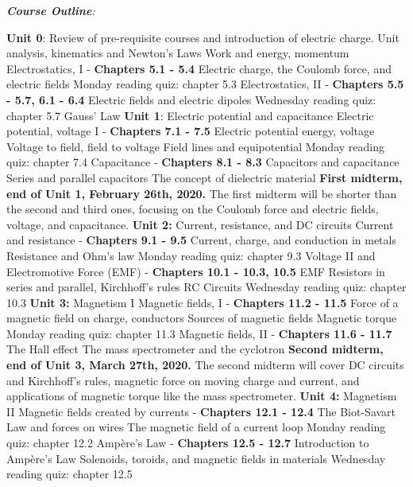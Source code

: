 \documentclass[10pt]{article}
\begin{document}
\clearpage
\small
\textit{\textbf{Course Outline}:}
\begin{outline}[enumerate]
\1 \textbf{Unit 0}: Review of pre-requisite courses and introduction of electric charge.
\2 Unit analysis, kinematics and Newton's Laws
\2 Work and energy, momentum
\2 Electrostatics, I - \textbf{Chapters 5.1 - 5.4}
\3 Electric charge, the Coulomb force, and electric fields
\3 Monday reading quiz: chapter 5.3
\2 Electrostatics, II - \textbf{Chapters 5.5 - 5.7, 6.1 - 6.4}
\3 Electric fields and electric dipoles
\3 Wednesday reading quiz: chapter 5.7
\3 Gauss' Law
\1 \textbf{Unit 1}: Electric potential and capacitance
\2 Electric potential, voltage I - \textbf{Chapters 7.1 - 7.5}
\3 Electric potential energy, voltage
\3 Voltage to field, field to voltage
\3 Field lines and equipotential
\3 Monday reading quiz: chapter 7.4
\2 Capacitance - \textbf{Chapters 8.1 - 8.3}
\3 Capacitors and capacitance
\3 Series and parallel capacitors
\3 The concept of dielectric material
\1 \textbf{First midterm, end of Unit 1, February 26th, 2020.} The first midterm will be shorter than the second and third ones, focusing on the Coulomb force and electric fields, voltage, and capacitance.
\1 \textbf{Unit 2:} Current, resistance, and DC circuits
\2 Current and resistance - \textbf{Chapters 9.1 - 9.5}
\3 Current, charge, and conduction in metals
\3 Resistance and Ohm's law
\3 Monday reading quiz: chapter 9.3
\2 Voltage II and Electromotive Force (EMF) - \textbf{Chapters 10.1 - 10.3, 10.5}
\3 EMF
\3 Resistors in series and parallel, Kirchhoff's rules
\3 RC Circuits
\3 Wednesday reading quiz: chapter 10.3
\1 \textbf{Unit 3:} Magnetism I
\2 Magnetic fields, I - \textbf{Chapters 11.2 - 11.5}
\3 Force of a magnetic field on charge, conductors
\3 Sources of magnetic fields
\3 Magnetic torque
\3 Monday reading quiz: chapter 11.3
\2 Magnetic fields, II - \textbf{Chapters 11.6 - 11.7}
\3 The Hall effect
\3 The mass spectrometer and the cyclotron
\1 \textbf{Second midterm, end of Unit 3, March 27th, 2020.} The second midterm will cover DC circuits and Kirchhoff's rules, magnetic force on moving charge and current, and applications of magnetic torque like the mass spectrometer.
\1 \textbf{Unit 4:} Magnetism II
\2 Magnetic fields created by currents - \textbf{Chapters 12.1 - 12.4}
\3 The Biot-Savart Law and forces on wires
\3 The magnetic field of a current loop
\3 Monday reading quiz: chapter 12.2
\2 Amp\`{e}re's Law - \textbf{Chapters 12.5 - 12.7}
\3 Introduction to Amp\`{e}re's Law
\3 Solenoids, toroids, and magnetic fields in materials
\3 Wednesday reading quiz: chapter 12.5

\end{outline}
\end{document}

